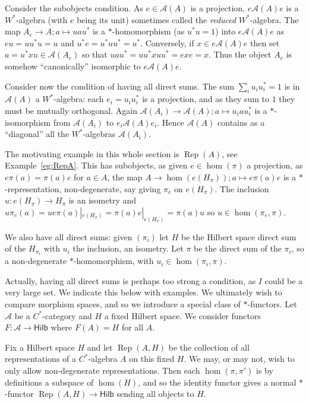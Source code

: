 \documentclass[a4paper,11pt]{article}
\theoremstyle{plain}
\theoremstyle{remark}
\newenvironment{example}
  {\pushQED{\qed}\renewcommand{\qedsymbol}{$\triangle$}\examplex}
  {\popQED\endexamplex}
\newcommand{\mc}[1]{\mathcal{#1}}
\newcommand{\catHilb}{\textsf{Hilb}}
\newcommand{\Rep}{\operatorname{Rep}}
\begin{document}
Consider the subobjects condition.  As $e\in\mc A(A)$ is a projection, $e \mc A(A) e$ is a $W^*$-algebra (with $e$ being its unit) sometimes called the \emph{reduced} $W^*$-algebra.   The map $A_e \to A; a \mapsto u a u^*$ is a $*$-homomorphism (as $u^*u=1$) into $e\mc A(A)e$ as $eu = uu^*u = u$ and $u^*e = u^*uu^* = u^*$.  Conversely, if $x\in e\mc A(A)e$ then set $a = u^*xu \in \mc A(A_e)$ so that $uau^* = uu^* x uu^* = exe = x$.  Thus the object $A_e$ is somehow ``canonically'' isomorphic to $e \mc A(A) e$.

Consider now the condition of having all direct sums.  The sum $\sum_i u_i u_i^*=1$ is in $\mc A(A)$ a $W^*$-algebra: each $e_i = u_i u_i^*$ is a projection, and as they sum to $1$ they must be mutually orthogonal.  Again $\mc A(A_i) \to \mc A(A); a \mapsto u_i a u_i^*$ is a $*$-isomorphism from $\mc A(A_i)$ to $e_i \mc A(A) e_i$.  Hence $\mc A(A)$ contains as a ``diagonal'' all the $W^*$-algebras $\mc A(A_i)$.

\begin{example}
The motivating example in this whole section is $\Rep(A)$, see Example~\ref{eg:RepA}.  This has subobjects, as given $e\in\hom(\pi)$ a projection, as $e\pi(a) = \pi(a)e$ for $a\in A$, the map $A\to \hom(e(H_\pi)); a \mapsto e\pi(a)e$ is a $*$-representation, non-degenerate, say giving $\pi_e$ on $e(H_\pi)$.  The inclusion $u \colon e(H_\pi) \to H_\pi$ is an isometry and $u \pi_e(a) = u e\pi(a)|_{e(H_\pi)} = \pi(a) e|_{e(H_\pi)} = \pi(a) u$ so $u\in\hom(\pi_e, \pi)$.

We also have all direct sums: given $(\pi_i)$ let $H$ be the Hilbert space direct sum of the $H_{\pi_i}$ with $u_i$ the inclusion, an isometry.  Let $\pi$ be the direct sum of the $\pi_i$, so a non-degenerate $*$-homomorphism, with $u_i \in \hom(\pi_i, \pi)$.
\end{example}

Actually, having all direct sums is perhaps too strong a condition, as $I$ could be a very large set.  We indicate this below with examples.  We ultimately wish to compare morphism spaces, and so we introduce a special class of $*$-functors.  Let $\mc A$ be a $C^*$-category and $H$ a fixed Hilbert space.  We consider functors $F \colon \mc A \to \catHilb$ where $F(A) = H$ for all $A$.

\begin{example}
Fix a Hilbert space $H$ and let $\Rep(A,H)$ be the collection of all representations of a $C^*$-algebra $A$ on this fixed $H$.  We may, or may not, wish to only allow non-degenerate representations.  Then each $\hom(\pi,\pi')$ is by definitions a subspace of $\hom(H)$, and so the identity functor gives a normal $*$-functor $\Rep(A,H) \to \catHilb$ sending all objects to $H$.
\end{example}
\end{document}
